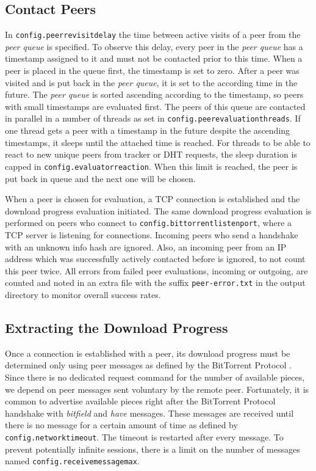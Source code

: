 \documentclass[10pt, a4paper, twoside, headsepline]{scrbook}
\renewcommand{\_}{\origunderscore\allowbreak}
\newcommand{\config}[1]{\texttt{config.\allowbreak #1}}
\begin{document}
\subsection{Contact Peers}
\label{cont}
In \config{peer\_revisit\_delay} the time between active visits of a peer from the \emph{peer queue} is specified. To observe this delay, every peer in the \emph{peer queue} has a timestamp assigned to it and must not be contacted prior to this time. When a peer is placed in the queue first, the timestamp is set to zero. After a peer was visited and is put back in the \emph{peer queue}, it is set to the according time in the future. The \emph{peer queue} is sorted ascending according to the timestamp, so peers with small timestamps are evaluated first. The peers of this queue are contacted in parallel in a number of threads as set in \config{peer\_evaluation\_threads}. If one thread gets a peer with a timestamp in the future despite the ascending timestamps, it sleeps until the attached time is reached. For threads to be able to react to new unique peers from tracker or DHT requests, the sleep duration is capped in \config{evaluator\_reaction}. When this limit is reached, the peer is put back in queue and the next one will be chosen.

When a peer is chosen for evaluation, a TCP connection is established and the download progress evaluation initiated. The same download progress evaluation is performed on peers who connect to \config{bittorrent\_listen\_port}, where a TCP server is listening for connections. Incoming peers who send a handshake with an unknown info hash are ignored. Also, an incoming peer from an IP address which was successfully actively contacted before is ignored, to not count this peer twice. All errors from failed peer evaluations, incoming or outgoing, are counted and noted in an extra file with the suffix \texttt{\_peer-error.txt} in the output directory to monitor overall success rates.

\subsection{Extracting the Download Progress}
\label{peer-evaluation}
Once a connection is established with a peer, its download progress must be determined only using peer messages as defined by the BitTorrent Protocol \cite{bep3}. Since there is no dedicated request command for the number of available pieces, we depend on peer messages sent voluntary by the remote peer. Fortunately, it is common to advertise available pieces right after the BitTorrent Protocol handshake with \emph{bitfield} and \emph{have} messages. These messages are received until there is no message for a certain amount of time as defined by \config{network\_timeout}. The timeout is restarted after every message. To prevent potentially infinite sessions, there is a limit on the number of messages named \config{receive\_message\_max}.
\end{document}
